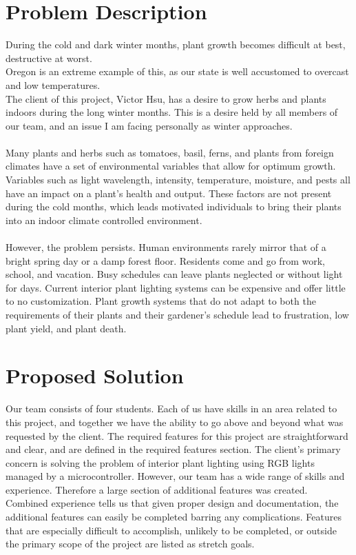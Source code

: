 \documentclass[onecolumn, draftclsnofoot,10pt, compsoc]{IEEEtran}
\begin{document}
	\section*{Problem Description}
	During the cold and dark winter months, plant growth becomes difficult at best, destructive at worst.
	\\Oregon is an extreme example of this, as our state is well accustomed to overcast and low temperatures.
	\\The client of this project, Victor Hsu, has a desire to grow herbs and plants indoors during the long winter months. This is a desire held by all members of our team, and an issue I am facing personally as winter approaches.
	\\\\Many plants and herbs such as tomatoes, basil, ferns, and plants from foreign climates have a set of environmental variables that allow for optimum growth. Variables such as light wavelength, intensity, temperature, moisture, and pests all have an impact on a plant's health and output. These factors are not present during the cold months, which leads motivated individuals to bring their plants into an indoor climate controlled environment.
	\\\\However, the problem persists. Human environments rarely mirror that of a bright spring day or a damp forest floor. Residents come and go from work, school, and vacation. Busy schedules can leave plants neglected or without light for days. Current interior plant lighting systems can be expensive and offer little to no customization. Plant growth systems that do not adapt to both the requirements of their plants and their gardener's schedule lead to frustration, low plant yield, and plant death.

	\section*{Proposed Solution}
	Our team consists of four students. Each of us have skills in an area related to this project, and together we have the ability to go above and beyond what was requested by the client.
	The required features for this project are straightforward and clear, and are defined in the required features section. The client's primary concern is solving the problem of interior plant lighting using RGB lights managed by a microcontroller. However, our team has a wide range of skills and experience. Therefore a large section of additional features was created.
	\\Combined experience tells us that given proper design and documentation, the additional features can easily be completed barring any complications. Features that are especially difficult to accomplish, unlikely to be completed, or outside the primary scope of the project are listed as stretch goals.
\end{document}
